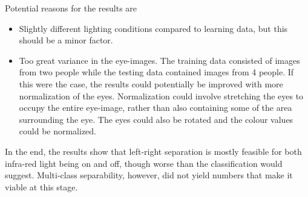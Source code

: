 Potential reasons for the results are
\begin{itemize}
	\item{Slightly different lighting conditions compared to learning data, but this should be a minor factor.}
	\item{Too great variance in the eye-images. 
		The training data consisted of images from two people while the testing data contained images from 4 people. 
		If this were the case, the results could potentially be improved with more normalization of the eyes. 
		Normalization could involve stretching the eyes to occupy the entire eye-image, rather than also containing some of the area surrounding the eye. 
		The eyes could also be rotated and the colour values could be normalized.}
\end{itemize}

In the end, the results show that left-right separation is mostly feasible for both infra-red light being on and off, though worse than the classification would suggest.
Multi-class separability, however, did not yield numbers that make it viable at this stage.
